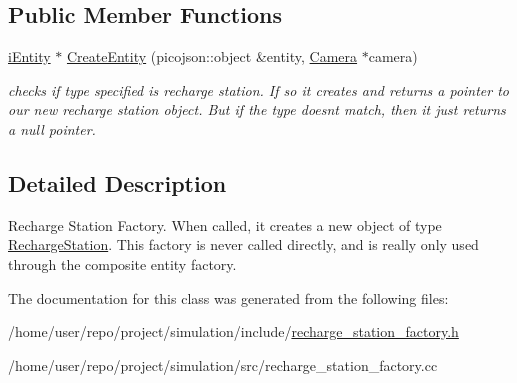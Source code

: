 \subsection*{Public Member Functions}
\begin{DoxyCompactItemize}
\item 
\mbox{\label{classRechargeStationFactory_a118b1c91fa7d108cf7830a4459c4e654}} 
\hyperlink{classiEntity}{i\+Entity} $\ast$ \hyperlink{classRechargeStationFactory_a118b1c91fa7d108cf7830a4459c4e654}{Create\+Entity} (picojson\+::object \&entity, \hyperlink{classCamera}{Camera} $\ast$camera)
\begin{DoxyCompactList}\small\item\em checks if type specified is recharge station. If so it creates and returns a pointer to our new recharge station object. But if the type doesn\textquotesingle{}t match, then it just returns a null pointer. \end{DoxyCompactList}\end{DoxyCompactItemize}


\subsection{Detailed Description}
Recharge Station Factory. When called, it creates a new object of type \hyperlink{classRechargeStation}{Recharge\+Station}. This factory is never called directly, and is really only used through the composite entity factory. 

The documentation for this class was generated from the following files\+:\begin{DoxyCompactItemize}
\item 
/home/user/repo/project/simulation/include/\hyperlink{recharge__station__factory_8h}{recharge\+\_\+station\+\_\+factory.\+h}\item 
/home/user/repo/project/simulation/src/recharge\+\_\+station\+\_\+factory.\+cc\end{DoxyCompactItemize}
